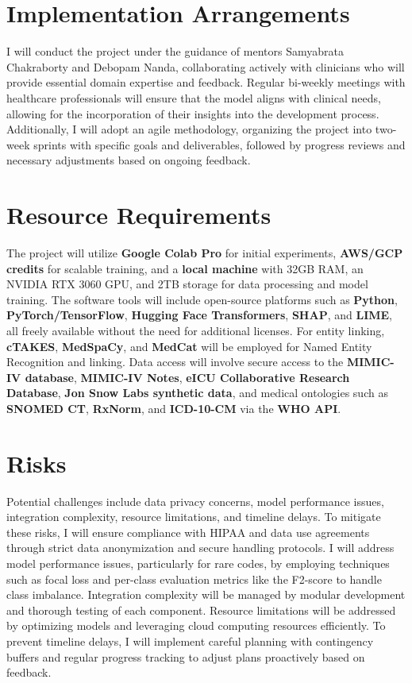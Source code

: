 \documentclass[10pt,a4paper]{article}
\begin{document}
\section{Implementation Arrangements}
I will conduct the project under the guidance of mentors Samyabrata Chakraborty and Debopam Nanda, collaborating actively with clinicians who will provide essential domain expertise and feedback. Regular bi-weekly meetings with healthcare professionals will ensure that the model aligns with clinical needs, allowing for the incorporation of their insights into the development process. Additionally, I will adopt an agile methodology, organizing the project into two-week sprints with specific goals and deliverables, followed by progress reviews and necessary adjustments based on ongoing feedback.

\section{Resource Requirements} 
The project will utilize \textbf{Google Colab Pro} for initial experiments, \textbf{AWS/GCP credits} for scalable training, and a \textbf{local machine} with 32GB RAM, an NVIDIA RTX 3060 GPU, and 2TB storage for data processing and model training. The software tools will include open-source platforms such as \textbf{Python}, \textbf{PyTorch/TensorFlow}, \textbf{Hugging Face Transformers}, \textbf{SHAP}, and \textbf{LIME}, all freely available without the need for additional licenses. For entity linking, \textbf{cTAKES}, \textbf{MedSpaCy}, and \textbf{MedCat} will be employed for Named Entity Recognition and linking. Data access will involve secure access to the \textbf{MIMIC-IV database}, \textbf{MIMIC-IV Notes}, \textbf{eICU Collaborative Research Database}, \textbf{Jon Snow Labs synthetic data}, and medical ontologies such as \textbf{SNOMED CT}, \textbf{RxNorm}, and \textbf{ICD-10-CM} via the \textbf{WHO API}.

\section{Risks}
Potential challenges include data privacy concerns, model performance issues, integration complexity, resource limitations, and timeline delays. To mitigate these risks, I will ensure compliance with HIPAA and data use agreements through strict data anonymization and secure handling protocols. I will address model performance issues, particularly for rare codes, by employing techniques such as focal loss and per-class evaluation metrics like the F2-score to handle class imbalance. Integration complexity will be managed by modular development and thorough testing of each component. Resource limitations will be addressed by optimizing models and leveraging cloud computing resources efficiently. To prevent timeline delays, I will implement careful planning with contingency buffers and regular progress tracking to adjust plans proactively based on feedback.
\end{document}
